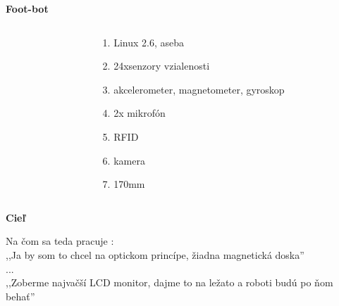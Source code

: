 \documentclass[xcolor=dvipsnames]{beamer}
\begin{document}
\begin{frame}{\bf Foot-bot}
\begin{columns}
\begin{column}{0.48\textwidth}
	\end{column}
	\begin{column}{0.48\textwidth}
		\begin{enumerate}
            \item Linux 2.6, aseba
            \item 24xsenzory vzialenosti
            \item akcelerometer, magnetometer, gyroskop
            \item 2x mikrofón
			\item RFID
            \item kamera
            \item 170mm
		\end{enumerate}
	\end{column}
\end{columns}

\end{frame}


\begin{frame}{\bf Cieľ}

Na čom sa teda pracuje :
\\
,,Ja by som to chcel na optickom princípe, žiadna magnetická doska'' \\
... \\
,,Zoberme najvačší LCD monitor, dajme to na ležato a roboti budú po ňom behať'' \\
\end{frame}
\end{document}

